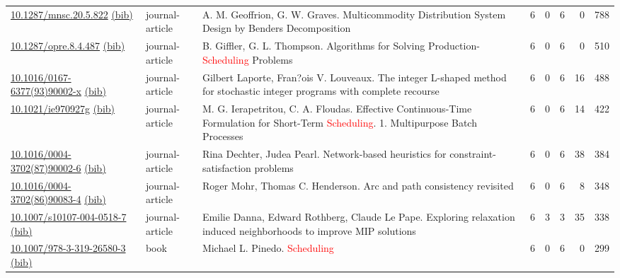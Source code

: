 {\begin{longtable}{p{5cm}lp{11cm}rrrrr}
\href{http://dx.doi.org/10.1287/mnsc.20.5.822}{10.1287/mnsc.20.5.822} \href{https://www.doi2bib.org/bib/10.1287/mnsc.20.5.822}{(bib)} & journal-article & A. M. Geoffrion, G. W. Graves. Multicommodity Distribution System Design by Benders Decomposition & 6 & 0 & 6 & 0 & 788 \\
\href{http://dx.doi.org/10.1287/opre.8.4.487}{10.1287/opre.8.4.487} \href{https://www.doi2bib.org/bib/10.1287/opre.8.4.487}{(bib)} & journal-article & B. Giffler, G. L. Thompson. Algorithms for Solving Production-\textcolor{red}{Scheduling} Problems & 6 & 0 & 6 & 0 & 510 \\
\href{http://dx.doi.org/10.1016/0167-6377(93)90002-x}{10.1016/0167-6377(93)90002-x} \href{https://www.doi2bib.org/bib/10.1016/0167-6377(93)90002-x}{(bib)} & journal-article & Gilbert Laporte, Fran?ois V. Louveaux. The integer L-shaped method for stochastic integer programs with complete recourse & 6 & 0 & 6 & 16 & 488 \\
\href{http://dx.doi.org/10.1021/ie970927g}{10.1021/ie970927g} \href{https://www.doi2bib.org/bib/10.1021/ie970927g}{(bib)} & journal-article & M. G. Ierapetritou, C. A. Floudas. Effective Continuous-Time Formulation for Short-Term \textcolor{red}{Scheduling}. 1. Multipurpose Batch Processes & 6 & 0 & 6 & 14 & 422 \\
\href{http://dx.doi.org/10.1016/0004-3702(87)90002-6}{10.1016/0004-3702(87)90002-6} \href{https://www.doi2bib.org/bib/10.1016/0004-3702(87)90002-6}{(bib)} & journal-article & Rina Dechter, Judea Pearl. Network-based heuristics for constraint-satisfaction problems & 6 & 0 & 6 & 38 & 384 \\
\href{http://dx.doi.org/10.1016/0004-3702(86)90083-4}{10.1016/0004-3702(86)90083-4} \href{https://www.doi2bib.org/bib/10.1016/0004-3702(86)90083-4}{(bib)} & journal-article & Roger Mohr, Thomas C. Henderson. Arc and path consistency revisited & 6 & 0 & 6 & 8 & 348 \\
\href{http://dx.doi.org/10.1007/s10107-004-0518-7}{10.1007/s10107-004-0518-7} \href{https://www.doi2bib.org/bib/10.1007/s10107-004-0518-7}{(bib)} & journal-article & Emilie Danna, Edward Rothberg, Claude Le Pape. Exploring relaxation induced neighborhoods to improve MIP solutions & 6 & 3 & 3 & 35 & 338 \\
\href{http://dx.doi.org/10.1007/978-3-319-26580-3}{10.1007/978-3-319-26580-3} \href{https://www.doi2bib.org/bib/10.1007/978-3-319-26580-3}{(bib)} & book & Michael L. Pinedo. \textcolor{red}{Scheduling} & 6 & 0 & 6 & 0 & 299 \\

\end{longtable}}
